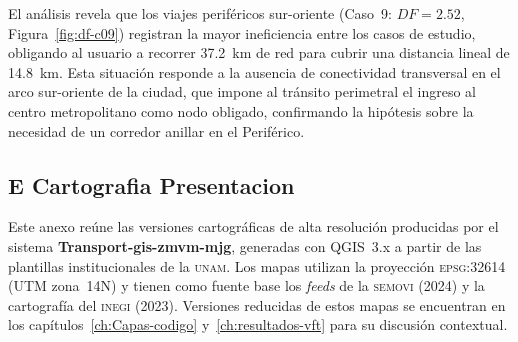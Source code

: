 El análisis revela que los viajes periféricos sur-oriente (Caso~9: $DF = 2.52$,
Figura~\ref{fig:df-c09}) registran la mayor ineficiencia entre los casos de
estudio, obligando al usuario a recorrer 37.2~km de red para cubrir una distancia
lineal de 14.8~km. Esta situación responde a la ausencia de conectividad
transversal en el arco sur-oriente de la ciudad, que impone al tránsito
perimetral el ingreso al centro metropolitano como nodo obligado, confirmando la
hipótesis sobre la necesidad de un corredor anillar en el Periférico.
\DIFaddbegin 


\begin{figure}[H]
    \centering
    \caption[Cartografía de presentación — Factor de Desviación por nodo]{
    \zmvm{}}
    \label{fig:mapa-df-presentacion}
\end{figure}
 \DIFaddend

\subsection*{E Cartografia Presentacion}

Este anexo reúne las versiones cartográficas de alta resolución producidas por el sistema \textbf{Transport-gis-zmvm-mjg},
generadas con QGIS~3.x a partir de las plantillas institucionales de la \textsc{unam}. Los mapas utilizan la proyección
\textsc{epsg}:32614 (UTM zona~14N) y tienen como fuente base los \textit{feeds} \gtfs{} de la \textsc{semovi} (2024) y la cartografía
del \textsc{inegi} (2023). Versiones reducidas de estos mapas se encuentran en los capítulos~\ref{ch:Capas-codigo}
y~\ref{ch:resultados-vft} para su discusión contextual.

